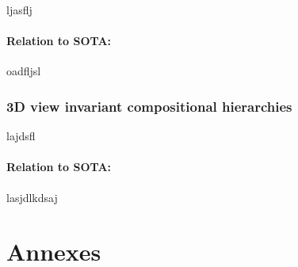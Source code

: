\documentclass[a4paper,11pt,pdf]{pacmanreport}
\begin{document}
ljasflj

\paragraph{Relation to SOTA:} oadfljsl

\subsubsection{3D view invariant compositional hierarchies}

lajdsfl

\paragraph{Relation to SOTA:} lasjdlkdsaj 






\newpage

\appendix
\section{Annexes}


\end{document}
